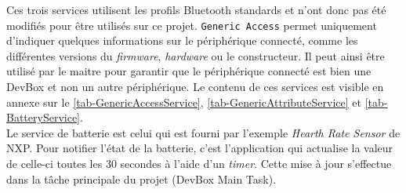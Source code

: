 \FloatBarrier
{}

Ces trois services utilisent les profils Bluetooth standards et n'ont donc pas été modifiés pour être utilisés sur ce projet. \texttt{Generic Access} permet uniquement d'indiquer quelques informations sur le périphérique connecté, comme les différentes versions du \textit{firmware}, \textit{hardware} ou le constructeur. Il peut ainsi être utilisé par le maitre pour garantir que le périphérique connecté est bien une DevBox et non un autre périphérique. Le contenu de ces services est visible en annexe sur le \cref{tab-GenericAccessService}, \cref{tab-GenericAttributeService} et \cref{tab-BatteryService}.\\

Le service de batterie est celui qui est fourni par l'exemple \textit{Hearth Rate Sensor} de NXP. Pour notifier l'état de la batterie, c'est l'application qui actualise la valeur de celle-ci toutes les 30 secondes à l'aide d'un \textit{timer}. Cette mise à jour s'effectue dans la tâche principale du projet (DevBox Main Task).


\FloatBarrier
{}


